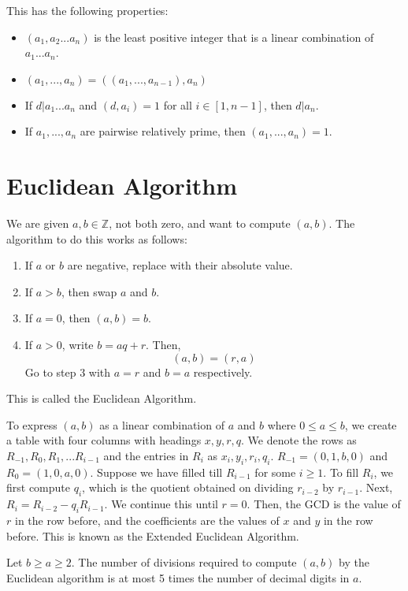 \documentclass[12pt,letterpaper]{book}
\theoremstyle{definition}
\newcommand{\Z}{\mathbb{Z}}
\begin{document}
This has the following properties:

\begin{itemize}
  \item $(a_1,a_2...a_n)$ is the least positive integer that is a linear combination of $a_1...a_n$.
  \item $(a_1,...,a_n) = ((a_1,...,a_{n-1}),a_n)$
  \item If $d | a_1...a_n$ and $(d,a_i) = 1$ for all $i \in [1,n-1]$, then $d|a_n$.
  \item If $a_1,...,a_n$ are pairwise relatively prime, then $(a_1,...,a_n) = 1$.
\end{itemize}

\section{Euclidean Algorithm}

We are given $a,b \in \Z$, not both zero, and want to compute $(a,b)$. The algorithm to do this works as follows:

\begin{enumerate}
  \item If $a$ or $b$ are negative, replace with their absolute value.
    \item If $a > b$, then swap $a$ and $b$.
    \item If $a = 0$, then $(a,b) = b$.
    \item If $a >0$, write $b = aq+r$. Then,
      \[(a,b) = (r,a)\]
      Go to step 3 with $a = r$ and $b=a$ respectively.
\end{enumerate}

This is called the Euclidean Algorithm.

To express $(a,b)$ as a linear combination of $a$ and $b$ where $0 \leq a \leq b$, we create a table with four columns with headings $x,y,r,q$. We denote the rows as $R_{-1}, R_0, R_1, ... R_{i-1}$ and the entries in $R_i$ as $x_i,y_i,r_i,q_i$. $R_{-1} = (0,1,b,0)$ and $R_0 = (1,0,a,0)$. Suppose we have filled till $R_{i-1}$ for some $i \geq 1$. To fill $R_i$, we first compute $q_i$, which is the quotient obtained on dividing $r_{i-2}$ by $r_{i-1}$. Next, $R_i = R_{i-2} - q_iR_{i-1}$. We continue this until $r=0$. Then, the GCD is the value of $r$ in the row before, and the coefficients are the values of $x$ and $y$ in the row before. This is known as the Extended Euclidean Algorithm.

\begin{theorem}
  Let $b \geq a \geq 2$. The number of divisions required to compute $(a,b)$ by the Euclidean algorithm is at most 5 times the number of decimal digits in $a$.
\end{theorem}
\end{document}
